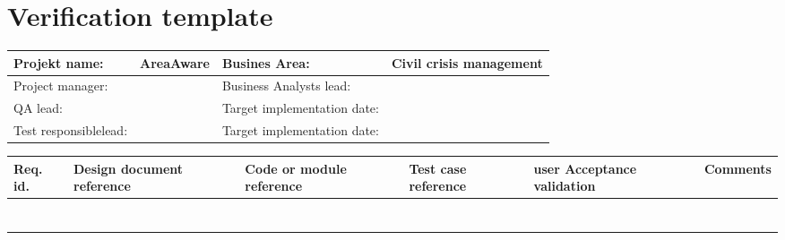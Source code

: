\appendix

\label{chp_appendixTemplate}
\chapter{Verification template}



\begin{sidewaystable}
	\begin{longtable}{| p{3.5cm}  | p{4.2cm} |  p{5cm}  | p{4cm} |  }
		\hline
		Projekt name: 	& AreaAware & Busines Area:	& Civil crisis management \\ \hline
		Project manager:& & Business Analysts lead: 	& \\ \hline
		QA lead: 		& & Target implementation date:	& \\ \hline
		Test responsiblelead: 		& & Target implementation date:	& \\ \hline
	\end{longtable}
	\vspace{-9pt}
	\begin{longtable}{| p{1.1cm}  | p{2cm}  | p{4.2cm} |  p{1.5cm}  | p{4cm}  |  p{3cm}  |} \hline
		Req. id. & Design document reference & Code or module reference & Test case reference & user Acceptance validation  & Comments \\ \hline	
		&& && & \\ \hline
		&& && & \\ \hline
		&& && &\\ \hline
		&& && & \\ \hline
		&& && & \\ \hline
		&& && &  \\ \hline
		&& && &  \\ \hline
	\end{longtable}
\end{sidewaystable}



